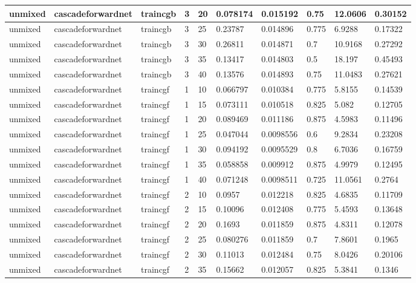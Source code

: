 \begin{longtable}{lllllllll}
unmixed & cascadeforwardnet & traincgb & 3 & 20 & 0.078174 & 0.015192 & 0.75 & 12.0606 & 0.30152 \\ \hline 
unmixed & cascadeforwardnet & traincgb & 3 & 25 & 0.23787 & 0.014896 & 0.775 & 6.9288 & 0.17322 \\ \hline 
unmixed & cascadeforwardnet & traincgb & 3 & 30 & 0.26811 & 0.014871 & 0.7 & 10.9168 & 0.27292 \\ \hline 
unmixed & cascadeforwardnet & traincgb & 3 & 35 & 0.13417 & 0.014803 & 0.5 & 18.197 & 0.45493 \\ \hline 
unmixed & cascadeforwardnet & traincgb & 3 & 40 & 0.13576 & 0.014893 & 0.75 & 11.0483 & 0.27621 \\ \hline 
unmixed & cascadeforwardnet & traincgf & 1 & 10 & 0.066797 & 0.010384 & 0.775 & 5.8155 & 0.14539 \\ \hline 
unmixed & cascadeforwardnet & traincgf & 1 & 15 & 0.073111 & 0.010518 & 0.825 & 5.082 & 0.12705 \\ \hline 
unmixed & cascadeforwardnet & traincgf & 1 & 20 & 0.089469 & 0.011186 & 0.875 & 4.5983 & 0.11496 \\ \hline 
unmixed & cascadeforwardnet & traincgf & 1 & 25 & 0.047044 & 0.0098556 & 0.6 & 9.2834 & 0.23208 \\ \hline 
unmixed & cascadeforwardnet & traincgf & 1 & 30 & 0.094192 & 0.0095529 & 0.8 & 6.7036 & 0.16759 \\ \hline 
unmixed & cascadeforwardnet & traincgf & 1 & 35 & 0.058858 & 0.009912 & 0.875 & 4.9979 & 0.12495 \\ \hline 
unmixed & cascadeforwardnet & traincgf & 1 & 40 & 0.071248 & 0.0098511 & 0.725 & 11.0561 & 0.2764 \\ \hline 
unmixed & cascadeforwardnet & traincgf & 2 & 10 & 0.0957 & 0.012218 & 0.825 & 4.6835 & 0.11709 \\ \hline 
unmixed & cascadeforwardnet & traincgf & 2 & 15 & 0.10096 & 0.012408 & 0.775 & 5.4593 & 0.13648 \\ \hline 
unmixed & cascadeforwardnet & traincgf & 2 & 20 & 0.1693 & 0.011859 & 0.875 & 4.8311 & 0.12078 \\ \hline 
unmixed & cascadeforwardnet & traincgf & 2 & 25 & 0.080276 & 0.011859 & 0.7 & 7.8601 & 0.1965 \\ \hline 
unmixed & cascadeforwardnet & traincgf & 2 & 30 & 0.11013 & 0.012484 & 0.75 & 8.0426 & 0.20106 \\ \hline 
unmixed & cascadeforwardnet & traincgf & 2 & 35 & 0.15662 & 0.012057 & 0.825 & 5.3841 & 0.1346 \\ \hline 

\end{longtable}

